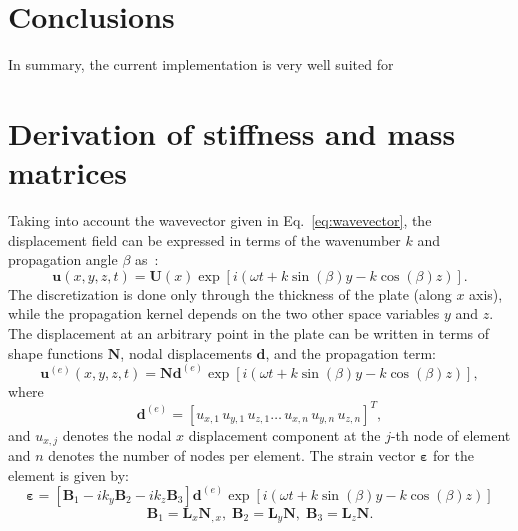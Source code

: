 \documentclass[preprint,12pt]{elsarticle}
\newcommand{\matr}[1]{\mathbf{#1}} %
\newcommand{\vect}[1]{\mathbf{#1}} %
\newcommand{\bs}[1]{\boldsymbol{#1}}
\begin{document}
	\section{Conclusions}

	
	In summary, the current implementation is very well suited for 
	 
	\appendix
	 \section{Derivation of stiffness and mass matrices}
	 Taking into account the wavevector given in Eq.~\ref{eq:wavevector}, the displacement field can be expressed in terms of the wavenumber $k$ and propagation angle $\beta$ as~\cite{Taupin2011}:
	  \begin{equation}
	 \vect{u}(x,y,z,t) = \matr{U}(x) \exp \left[ i (\omega t + k \sin (\beta) y - k \cos (\beta) z)\right].
	 \end{equation}
	 The discretization is done only through the thickness of the plate (along $x$ axis), while the propagation kernel depends on the two other space variables $y$ and $z$. The displacement at an arbitrary point in the plate can be written in terms of shape functions $ \matr{N}$, nodal displacements $ \vect{d}$, and the propagation term:
	 \begin{equation}
	 \vect{u}^{(e)}(x,y,z,t) = \matr{N} \vect{d}^{(e)} \exp \left[ i (\omega t + k \sin (\beta) y - k \cos (\beta) z)\right],
	 \end{equation}
	 where
	 \begin{equation}
	 \vect{d}^{(e)} =  \left[ u_{x,1} \, u_{y,1} \, u_{z,1} \ldots  \, u_{x,n} \, u_{y,n} \, u_{z,n} \right]^T,
	 \end{equation}
	 and $u_{x,j}$ denotes the nodal $x$ displacement component at the $j$-th node of element and $n$ denotes the number of nodes per element.
	 The strain vector $\bs{\varepsilon}$ for the element is given by:
	  \begin{equation}
	 \bs{\varepsilon}= \left[ \matr{B}_1 -i k_y \matr{B}_2 -i k_z \matr{B}_3 \right] \vect{d}^{(e)} \exp \left[ i (\omega t + k \sin (\beta) y - k \cos (\beta) z)\right]
	 \end{equation}
	  \begin{equation}
	 \matr{B}_1= \matr{L}_x \matr{N}_{,x},\; \matr{B}_2= \matr{L}_y \matr{N},\; \matr{B}_3= \matr{L}_z \matr{N}.
	 \end{equation}
\end{document}
